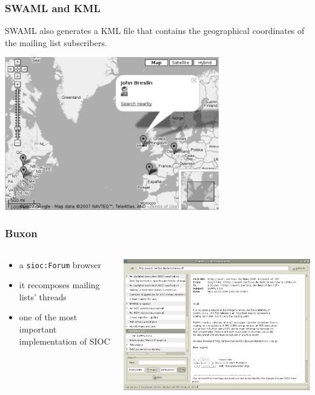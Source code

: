 \documentclass[spanish,notes=hide,16pt]{beamer}
\begin{document}
\frame
{
  \frametitle{SWAML and KML}

  SWAML also generates a KML file that contains the geographical coordinates 
  of the mailing list subscribers.

  \begin{center}
    \includegraphics[width=0.7\textwidth]{images/googlemaps.png}
  \end{center}
}
\frame
{
  \frametitle{Buxon}

  \begin{columns}
   \begin{column}{0.32\textwidth}
	\begin{itemize}
	  \item a \texttt{sioc:Forum} browser
	  \item it recomposes mailing lists' threads
	  \item one of the most important implementation of SIOC
	\end{itemize}
   \end{column}
   \begin{column}{0.68\textwidth}
	\includegraphics[width=\textwidth]{images/buxon.png}
   \end{column}
  \end{columns}
}
\end{document}

